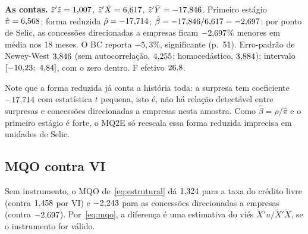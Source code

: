 \begin{table}[H]\centering\small
\caption{Primeiro estágio: $X^{18}_t$ na surpresa (amostra das concessões)}

\end{table}
\begin{table}[H]\centering\small
\caption{Forma reduzida: $Y^{18}_t$ (log das concessões $\times100$) na surpresa}

\end{table}
\begin{table}[H]\centering\small
\caption{Segundo estágio: $Y^{18}_t$ no valor previsto}

\end{table}

\textbf{As contas.} $\tilde z'\tilde z=1{,}007$, $\tilde z'\tilde X=6{,}617$, $\tilde z'\tilde Y=-17{,}846$.
Primeiro estágio $\hat\pi=6{,}568$; forma reduzida $\hat\rho=-17{,}714$; $\hat\beta=-17{,}846/6{,}617=-2{,}697$:
por ponto de Selic, as concessões direcionadas a empresas ficam $-2{,}697$\% menores em média nos 18
meses. O BC reporta $-5{,}3$\%, significante (p.~51). Erro-padrão de Newey-West $3{,}846$ (sem
autocorrelação, $4{,}255$; homocedástico, $3{,}884$); intervalo $[-10{,}23;\ 4{,}84]$, com o zero
dentro. F efetivo $26{,}8$.

Note que a forma reduzida já conta a história toda: a surpresa tem coeficiente $-17{,}714$ com
estatística $t$ pequena, isto é, não há relação detectável entre surpresas e concessões
direcionadas a empresas nesta amostra. Como $\hat\beta=\hat\rho/\hat\pi$ e o primeiro estágio é
forte, o MQ2E só reescala essa forma reduzida imprecisa em unidades de Selic.

\subsection{MQO contra VI}
Sem instrumento, o MQO de~\eqref{eq:estrutural} dá $1{,}324$ para a taxa do crédito livre
(contra $1{,}458$ por VI) e $-2{,}243$ para as concessões direcionadas a empresas (contra
$-2{,}697$). Por~\eqref{eq:mqo}, a diferença é uma estimativa do viés $\tilde X'u/\tilde X'\tilde X$,
se o instrumento for válido.
